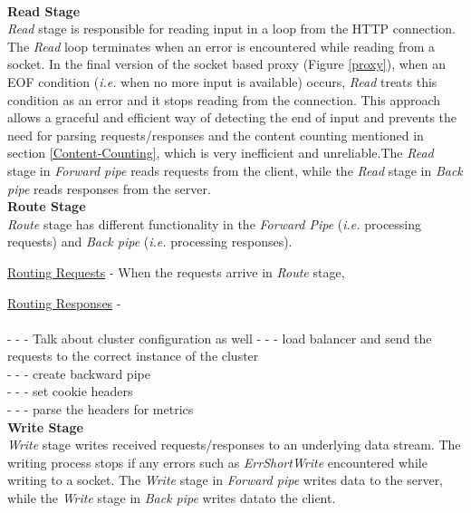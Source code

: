 \documentclass[a4paper,11pt,twoside]{article}
\begin{document}
\noindent\\
\textbf{Read Stage} \\
\textit{Read} stage is responsible for reading input in a loop from the HTTP connection. The \textit{Read} loop terminates when an error is encountered while reading from a socket. In the final version of the socket based proxy (Figure \ref{proxy}), when an EOF condition (\textit{i.e.}  when no more input is available) occurs, \textit{Read} treats this condition as an error and it stops reading from the connection. This approach allows a graceful and efficient way of detecting the end of input and prevents the need for parsing requests/responses and the content counting mentioned in section \ref{Content-Counting}, which is very inefficient and unreliable.The \textit{Read} stage in \textit{Forward pipe} reads requests from the client, while the \textit{Read} stage in \textit{Back pipe} reads responses from the server.   \\

\noindent
\textbf{Route Stage} \\
\textit{Route} stage has different functionality in the \textit{Forward Pipe} (\textit{i.e.} processing requests) and \textit{Back pipe} (\textit{i.e.} processing responses).    


\underline{Routing Requests} - When the requests arrive in \textit{Route} stage,   

\underline{Routing Responses} - \\\\




			-  -  - Talk about cluster configuration as well  
  			-  -  - load balancer and send the requests to the correct instance of the cluster\\
  			-  -  - create backward pipe\\
  			-  -  - set cookie headers\\
  			-  -  - parse the headers for metrics\\
  
\noindent
\textbf{Write Stage} \\
\textit{Write} stage writes received requests/responses to an underlying data stream. The writing process stops if any errors such as \textit{ErrShortWrite} encountered while writing to a socket. The \textit{Write} stage in \textit{Forward pipe} writes data to the server, while the \textit{Write} stage in \textit{Back pipe} writes datato the client.   \\
\end{document}
